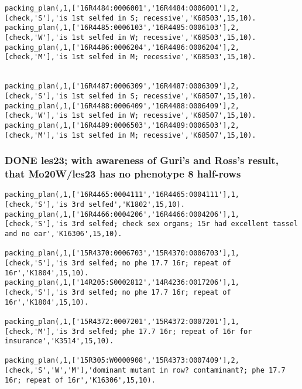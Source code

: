 \documentclass[11pt]{article}
\begin{document}
\begin{verbatim}
packing_plan(,1,['16R4484:0006001','16R4484:0006001'],2,[check,'S'],'is 1st selfed in S; recessive','K68503',15,10).
packing_plan(,1,['16R4485:0006103','16R4485:0006103'],2,[check,'W'],'is 1st selfed in W; recessive','K68503',15,10).
packing_plan(,1,['16R4486:0006204','16R4486:0006204'],2,[check,'M'],'is 1st selfed in M; recessive','K68503',15,10).


packing_plan(,1,['16R4487:0006309','16R4487:0006309'],2,[check,'S'],'is 1st selfed in S; recessive','K68507',15,10).
packing_plan(,1,['16R4488:0006409','16R4488:0006409'],2,[check,'W'],'is 1st selfed in W; recessive','K68507',15,10).
packing_plan(,1,['16R4489:0006503','16R4489:0006503'],2,[check,'M'],'is 1st selfed in M; recessive','K68507',15,10).
\end{verbatim}




\subsubsection{{\bfseries\sffamily DONE} les23; with awareness of Guri's and Ross's result, that Mo20W/les23 has no phenotype 8 half-rows}
\label{sec-4-4-5}


\begin{verbatim}
packing_plan(,1,['16R4465:0004111','16R4465:0004111'],1,[check,'S'],'is 3rd selfed','K1802',15,10).
packing_plan(,1,['16R4466:0004206','16R4466:0004206'],1,[check,'S'],'is 3rd selfed; check sex organs; 15r had excellent tassel and no ear','K16306',15,10).

packing_plan(,1,['15R4370:0006703','15R4370:0006703'],1,[check,'S'],'is 3rd selfed; no phe 17.7 16r; repeat of 16r','K1804',15,10).
packing_plan(,1,['14R205:S0002812','14R4236:0017206'],1,[check,'S'],'is 3rd selfed; no phe 17.7 16r; repeat of 16r','K1804',15,10).

packing_plan(,1,['15R4372:0007201','15R4372:0007201'],1,[check,'M'],'is 3rd selfed; phe 17.7 16r; repeat of 16r for insurance','K3514',15,10).

packing_plan(,1,['15R305:W0000908','15R4373:0007409'],2,[check,'S','W','M'],'dominant mutant in row? contaminant?; phe 17.7 16r; repeat of 16r','K16306',15,10).
\end{verbatim}
\end{document}

